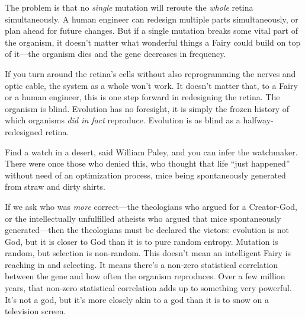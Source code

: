 {
 The problem is that no \textit{single} mutation will reroute the
\textit{whole} retina simultaneously. A human engineer can redesign
multiple parts simultaneously, or plan ahead for future changes. But if
a single mutation breaks some vital part of the organism, it
doesn't matter what wonderful things a Fairy could
build on top of it---the organism dies and the gene decreases in
frequency.}

{
 If you turn around the retina's cells without also
reprogramming the nerves and optic cable, the system as a whole
won't work. It doesn't matter that, to
a Fairy or a human engineer, this is one step forward in redesigning
the retina. The organism is blind. Evolution has no foresight, it is
simply the frozen history of which organisms \textit{did in fact}
reproduce. Evolution is as blind as a halfway-redesigned retina.}

{
 Find a watch in a desert, said William Paley, and you can infer
the watchmaker. There were once those who denied this, who thought that
life ``just happened'' without need
of an optimization process, mice being spontaneously generated from
straw and dirty shirts.}

{
 If we ask who was \textit{more} correct---the theologians who
argued for a Creator-God, or the intellectually unfulfilled atheists
who argued that mice spontaneously generated---then the theologians
must be declared the victors: evolution is not God, but it is closer to
God than it is to pure random entropy. Mutation is random, but
selection is non-random. This doesn't mean an
intelligent Fairy is reaching in and selecting. It means
there's a non-zero statistical correlation between the
gene and how often the organism reproduces. Over a few million years,
that non-zero statistical correlation adds up to something very
powerful. It's not a god, but it's more
closely akin to a god than it is to snow on a television screen.}

